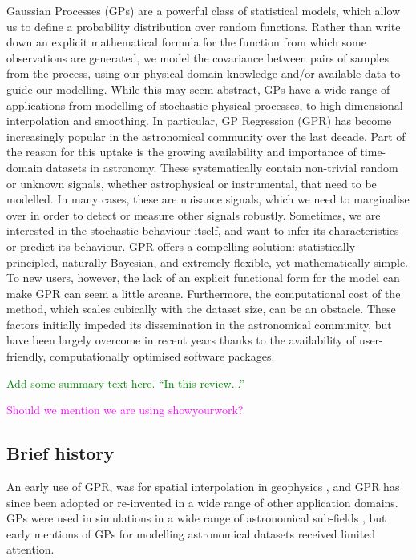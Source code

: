 \documentclass[letterpaper]{ar-1col}
\newcommand{\suz}[1]{\textcolor{magenta}{#1}}
\newcommand{\dan}[1]{\textcolor{green}{#1}}
\begin{document}
Gaussian Processes (GPs) are a powerful class of statistical models, which allow us to define a probability distribution over random functions. Rather than write down an explicit mathematical formula for the function from which some observations are generated, we model the covariance between pairs of samples from the process, using our physical domain knowledge and/or available data to guide our modelling.
While this may seem abstract, GPs have a wide range of applications from modelling of stochastic physical processes, to high dimensional interpolation and smoothing.
In particular, GP Regression (GPR) has become increasingly popular in the astronomical community over the last decade. Part of the reason for this uptake is the growing availability and importance of time-domain datasets in astronomy. These systematically contain non-trivial random or unknown signals, whether astrophysical or instrumental, that need to be modelled. In many cases, these are nuisance signals, which we need to marginalise over in order to detect or measure other signals robustly. Sometimes, we are interested in the stochastic behaviour itself, and want to infer its characteristics or predict its behaviour. GPR offers a compelling solution: statistically principled, naturally Bayesian, and extremely flexible, yet mathematically simple. To new users, however, the lack of an explicit functional form for the model can make GPR can seem a little arcane. Furthermore, the computational cost of the method, which scales cubically with the dataset size, can be an obstacle. These factors initially impeded its dissemination in the astronomical community, but have been largely overcome in recent years thanks to the availability of user-friendly, computationally optimised software packages.

\dan{Add some summary text here. ``In this review...''}


\suz{Should we mention we are using showyourwork?}

\subsection{Brief history}

An early use of GPR, was for spatial interpolation in geophysics \citep{kriging}, and GPR has since been adopted or re-invented in a wide range of other application domains. GPs were used in simulations in a wide range of astronomical sub-fields \citep[see e.g.][]{1980asfr.symp..159B,1988JGR....9311569C,1997ApJ...483L...1P}, but early mentions of GPs for modelling astronomical datasets \citep[see e.g.][]{1976MitAG..38..192D,1978A&A....70..777V,1991MGeo...16..313J} received limited attention.
\end{document}

